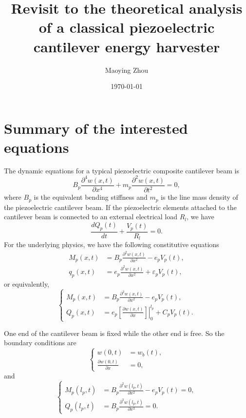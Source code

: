 \documentclass{article}
\title{Revisit to the theoretical analysis of a classical piezoelectric cantilever energy harvester}
\author{Maoying Zhou}
\date{\today}
\begin{document}
\maketitle

\section{Summary of the interested equations}

The dynamic equations for a typical piezoelectric composite cantilever beam is 
\begin{equation}
    B_p \frac{\partial^4 w(x,t)}{\partial x^4} + m_p \frac{\partial^2 w(x,t)}{\partial t^2} = 0,
\end{equation}
where $B_p$ is the equivalent bending stiffness and $m_p$ is the line mass density of the piezoelectric cantilever beam. If the piezoelectric elements attached to the cantilever beam is connected to an external electrical load $R_l$, we have
\begin{equation}
    \frac{d Q_p(t)}{d t} + \frac{V_p(t)}{R_l} = 0.
\end{equation}
For the underlying physics, we have the following constitutive equations
\begin{equation}
    \begin{aligned}
        M_p(x,t) &= B_p \frac{\partial^2 w(x,t)}{\partial x^2} - e_p V_p(t), \\
        q_p(x,t) &= e_p \frac{\partial^2 w(x,t)}{\partial x^2} + \varepsilon_p V_p(t),
    \end{aligned}
\end{equation}
or equivalently,
\begin{equation}
    \left\{\begin{aligned}
        M_p(x,t) &= B_p \frac{\partial^2 w(x,t)}{\partial x^2} - e_p V_p(t), \\
        Q_p(x,t) &= e_p \left.\left[ \frac{\partial w(x,t)}{\partial x} \right]\right|_0^{l_p} + C_p V_p(t).
    \end{aligned}\right.
\end{equation}

One end of the cantilever beam is fixed while the other end is free. So the boundary conditions are
\begin{equation}
    \left\{\begin{aligned}
        w(0,t) &= w_b(t), \\
        \frac{\partial w(0,t)}{\partial x} &= 0,
    \end{aligned}\right.
\end{equation}
and
\begin{equation}
    \left\{\begin{aligned}
        M_p(l_p,t) &= B_p \frac{\partial^2 w(l_p,t)}{\partial x^2} - e_p V_p(t) = 0, \\
        Q_p(l_p,t) &= B_p \frac{\partial^3 w(l_p,t)}{\partial x^3} = 0.
    \end{aligned}\right.
\end{equation}
\end{document}
